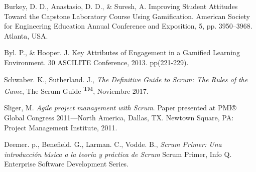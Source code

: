 \begin{thebibliography}{9}
        Burkey, D. D., Anastasio, D. D., \& Suresh, A.
        Improving Student Attitudes Toward the Capstone Laboratory Course Using Gamification.
        American Society for Engineering Education Annual Conference and Exposition, 5, pp. 3950–3968. Atlanta, USA.

        Byl. P., \& Hooper. J.
        Key Attributes of Engagement in a Gamified Learning Environment.
        30 ASCILITE Conference, 2013. pp(221-229).





        Schwaber. K., Sutherland. J.,
        {\it The Definitive Guide to Scrum: The Rules of the Game},
        The Scrum Guide \textsuperscript{TM}, Noviembre 2017.

        Sliger, M.
        {\it Agile project management with Scrum}.
        Paper presented at PMI® Global Congress 2011—North America, Dallas, TX. Newtown Square, PA: Project Management Institute, 2011.

        Deemer. p., Benefield. G., Larman. C., Vodde. B.,
        {\it Scrum Primer: Una introducción básica a la teoría y práctica de Scrum}
        Scrum Primer, Info Q. Enterprise Software Development Series.





\end{thebibliography}
